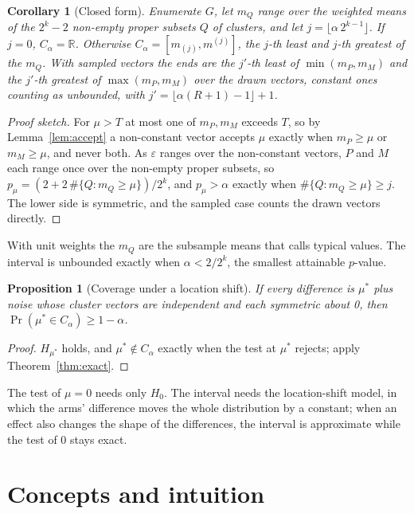 \documentclass[11pt]{article}
\theoremstyle{plain}
\newtheorem{proposition}[theorem]{Proposition}
\newtheorem{corollary}[theorem]{Corollary}
\theoremstyle{definition}
\theoremstyle{remark}
\newcommand{\sgn}{\varepsilon}
\begin{document}
\begin{corollary}[Closed form]\label{cor:closed}
Enumerate $G$, let $m_Q$ range over the weighted means of the $2^k - 2$ non-empty proper subsets
$Q$ of clusters, and let $j = \lfloor \alpha\, 2^{k-1} \rfloor$. If $j = 0$, $C_\alpha =
\mathbb{R}$. Otherwise $C_\alpha = [m_{(j)}, m^{(j)}]$, the $j$-th least and $j$-th greatest of the
$m_Q$. With sampled vectors the ends are the $j'$-th least of $\min(m_P, m_M)$ and the $j'$-th
greatest of $\max(m_P, m_M)$ over the drawn vectors, constant ones counting as unbounded, with
$j' = \lfloor \alpha (R + 1) - 1 \rfloor + 1$.
\end{corollary}
\begin{proof}[Proof sketch]
For $\mu > T$ at most one of $m_P, m_M$ exceeds $T$, so by Lemma~\ref{lem:accept} a non-constant vector
accepts $\mu$ exactly when $m_P \ge \mu$ or $m_M \ge \mu$, and never both. As $\sgn$ ranges over
the non-constant vectors, $P$ and $M$ each range once over the non-empty proper subsets, so $p_\mu =
(2 + 2\,\#\{Q : m_Q \ge \mu\})/2^k$, and $p_\mu > \alpha$ exactly when $\#\{Q : m_Q \ge \mu\} \ge
j$. The lower side is symmetric, and the sampled case counts the drawn vectors directly.
\end{proof}

With unit weights the $m_Q$ are the subsample means that \citet{hartigan1969} calls typical values.
The interval is unbounded exactly when $\alpha < 2/2^k$, the smallest attainable $p$-value.

\begin{proposition}[Coverage under a location shift]\label{prop:cover}
If every difference is $\mu^\ast$ plus noise whose cluster vectors are independent and each
symmetric about 0, then $\Pr(\mu^\ast \in C_\alpha) \ge 1 - \alpha$.
\end{proposition}
\begin{proof}
$H_{\mu^\ast}$ holds, and $\mu^\ast \notin C_\alpha$ exactly when the test at $\mu^\ast$ rejects;
apply Theorem~\ref{thm:exact}.
\end{proof}

The test of $\mu = 0$ needs only $H_0$. The interval needs the location-shift model, in which the
arms' difference moves the whole distribution by a constant; when an effect also changes the shape
of the differences, the interval is approximate while the test of 0 stays exact.

\section{Concepts and intuition}
\end{document}
